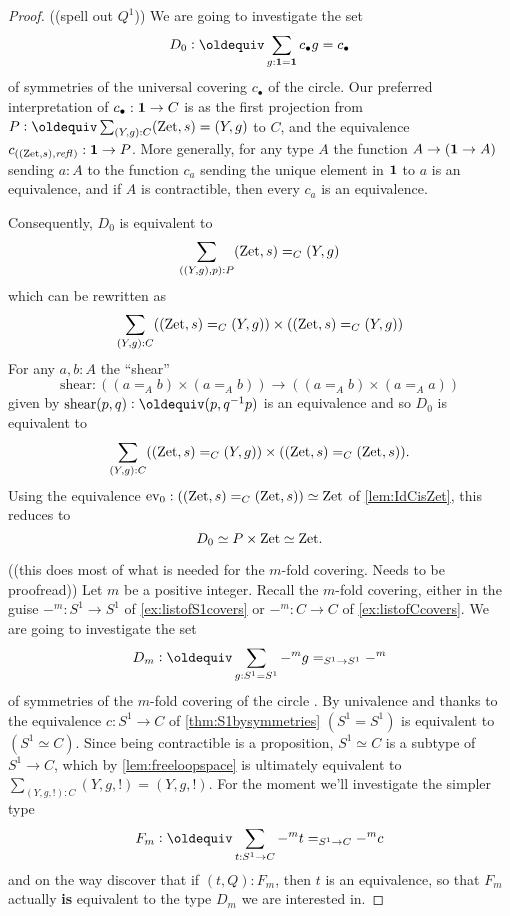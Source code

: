   \begin{proof}
  ((spell out $Q^1$))
We are going to investigate the set 
$$D_0\defequi\sum_{g:\bn 1=\bn 1}c_\bullet g=c_\bullet$$ 
of symmetries of the universal covering $c_\bullet$ of the circle.  
Our preferred interpretation of $c_\bullet:\mathbf{1}\to C$ is as the first projection from $P\defequi\sum_{(Y,g):C}(\zet,s)=(Y,g)$ to $C$, and the equivalence $c_{((\mathrm{Zet},s),\mathop{{\it refl}_{}})}:\mathbf{1}\to P$. %
More generally, for any type $A$ the function $A\to(\mathbf{1}\to A)$ sending $a:A$ to the function $c_a$ sending the unique element in $\mathbf{1}$ to $a$ is an equivalence, and if $A$ is contractible, then every $c_a$ is an equivalence.

   Consequently, $D_0$ is equivalent to
$$\sum_{((Y,g),p):P}(\mathrm{Zet},s)=_C(Y,g)$$ 
which can be rewritten as
$$\sum_{(Y,g):C}((\mathrm{Zet},s)=_C(Y,g))\times((\mathrm{Zet},s)=_C(Y,g))
$$
For any $a,b:A$ the ``shear'' 
$$\mathrm{shear}:((a=_Ab)\times(a=_Ab))\to((a=_Ab)\times(a=_Aa))$$ 
given by $\mathrm{shear}(p,q)\defequi(p,q^{-1}p)$
is an equivalence and
so $D_0$ is equivalent to 
$$\sum_{(Y,g):C}((\mathrm{Zet},s)=_C(Y,g))\times ((\mathrm{Zet},s)=_C(\mathrm{Zet},s)).
$$
Using the equivalence $\mathrm{ev}_0:((\mathrm{Zet},s)=_C(\mathrm{Zet},s))\simeq\mathrm{Zet}$ of \cref{lem:IdCisZet}, this
 reduces to 
$$D_0\simeq P\times\mathrm{Zet}\simeq\mathrm{Zet}.$$
    
((this does most of what is needed for the $m$-fold covering.  Needs to be proofread))
    Let $m$ be a positive integer.  
Recall the $m$-fold covering, either in the guise $-^m:S^1\to S^1$ of \cref{ex:listofS1covers} or $-^m:C\to C$ of \cref{ex:listofCcovers}.
We are going to investigate the set
$$D_m\defequi\sum_{g:S^1=S^1}-^mg=_{S^1\to S^1}-^m$$  
of symmetries of the $m$-fold covering of the circle%
.  
By univalence and thanks to the equivalence $c:S^1\to C$ of \cref{thm:S1bysymmetries} $(S^1= S^1)$ is equivalent to $(S^1\simeq C)$.
Since being contractible is a proposition, $S^1\simeq C$ is a subtype of $S^1\to C$,
which by \cref{lem:freeloopspace} is ultimately equivalent to $\sum_{(Y,g,!):C}(Y,g,!)=(Y,g,!)$. 
For the moment we'll investigate the simpler type 
$$F_m\defequi\sum_{t:S^1\to C}-^mt=_{S^1\to C}-^mc$$
and on the way discover that if $(t,Q):F_m$, then $t$ is an equivalence, so that $F_m$ actually {\bf is} equivalent to the type $D_m$ we are interested in.


\end{proof}
